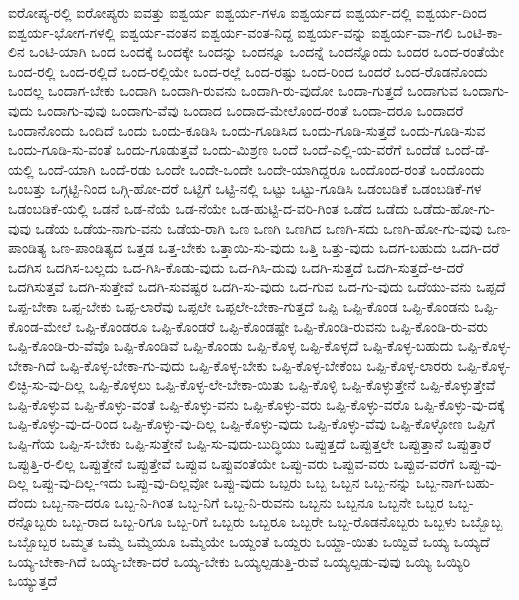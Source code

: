 {ಐರೋಪ್ಯ-ರಲ್ಲಿ
ಐರೋಪ್ಯರು
ಐವತ್ತು
ಐಶ್ವರ್ಯ
ಐಶ್ವರ್ಯ-ಗಳೂ
ಐಶ್ವರ್ಯದ
ಐಶ್ವರ್ಯ-ದಲ್ಲಿ
ಐಶ್ವರ್ಯ-ದಿಂದ
ಐಶ್ವರ್ಯ-ಭೋಗ-ಗಳಲ್ಲಿ
ಐಶ್ವರ್ಯ-ವಂತನ
ಐಶ್ವರ್ಯ-ವಂತ-ನಿದ್ದ
ಐಶ್ವರ್ಯ-ವನ್ನು
ಐಶ್ವರ್ಯ-ವಾ-ಗಲಿ
ಒಂಟಿ-ಕಾ-ಲಿನ
ಒಂಟಿ-ಯಾಗಿ
ಒಂದ
ಒಂದಕ್ಕೆ
ಒಂದಕ್ಕೇ
ಒಂದನ್ನು
ಒಂದನ್ನೂ
ಒಂದನ್ನೆ
ಒಂದನ್ನೊಂದು
ಒಂದರ
ಒಂದ-ರಂತೆಯೇ
ಒಂದ-ರಲ್ಲಿ
ಒಂದ-ರಲ್ಲಿದೆ
ಒಂದ-ರಲ್ಲಿಯೇ
ಒಂದ-ರಲ್ಲೆ
ಒಂದ-ರಷ್ಟು
ಒಂದ-ರಿಂದ
ಒಂದರೆ
ಒಂದ-ರೊಡನೊಂದು
ಒಂದಲ್ಲ
ಒಂದಾಗ-ಬೇಕು
ಒಂದಾಗಿ
ಒಂದಾಗಿ-ರುವನು
ಒಂದಾಗಿ-ರು-ವುದೋ
ಒಂದಾ-ಗುತ್ತದೆ
ಒಂದಾಗುವ
ಒಂದಾಗು-ವುದು
ಒಂದಾಗು-ವುವು
ಒಂದಾಗು-ವೆವು
ಒಂದಾದ
ಒಂದಾದ-ಮೇಲೊಂದ-ರಂತೆ
ಒಂದಾ-ದರೂ
ಒಂದಾದರೆ
ಒಂದಾನೊಂದು
ಒಂದಿದೆ
ಒಂದು
ಒಂದು-ಕೂಡಿಸಿ
ಒಂದು-ಗೂಡಿಸಿದ
ಒಂದು-ಗೂಡಿ-ಸುತ್ತದೆ
ಒಂದು-ಗೂಡಿ-ಸುವ
ಒಂದು-ಗೂಡಿ-ಸು-ವಂತೆ
ಒಂದು-ಗೂಡುತ್ತವೆ
ಒಂದು-ಮಿಶ್ರಣ
ಒಂದೆ
ಒಂದೆ-ಎಲ್ಲಿ-ಯ-ವರೆಗೆ
ಒಂದೆಡೆ
ಒಂದೆ-ಡೆ-ಯಲ್ಲಿ
ಒಂದೆ-ಯಾಗಿ
ಒಂದೆ-ರಡು
ಒಂದೇ
ಒಂದೇ-ಒಂದೇ
ಒಂದೇ-ಯಾಗಿದ್ದರೂ
ಒಂದೊಂದ-ರಂತೆ
ಒಂದೊಂದು
ಒಂಬತ್ತು
ಒಗ್ಗಟ್ಟಿ-ನಿಂದ
ಒಗ್ಗಿ-ಹೋ-ದರೆ
ಒಟ್ಟಿಗೆ
ಒಟ್ಟಿ-ನಲ್ಲಿ
ಒಟ್ಟು
ಒಟ್ಟು-ಗೂಡಿಸಿ
ಒಡಂಬಡಿಕೆ
ಒಡಂಬಡಿಕೆ-ಗಳ
ಒಡಂಬಡಿಕೆ-ಯಲ್ಲಿ
ಒಡನೆ
ಒಡ-ನೆಯೆ
ಒಡ-ನೆಯೇ
ಒಡ-ಹುಟ್ಟಿ-ದ-ವರಿ-ಗಿಂತ
ಒಡೆದ
ಒಡೆದು
ಒಡೆದು-ಹೋ-ಗು-ವುವು
ಒಡೆಯ
ಒಡೆಯ-ನಾಗು-ವನು
ಒಡೆಯ-ರಾಗಿ
ಒಣ
ಒಣಗಿ
ಒಣಗಿದ
ಒಣಗಿ-ಸದು
ಒಣಗಿ-ಹೋ-ಗು-ವುವು
ಒಣ-ಪಾಂಡಿತ್ಯ
ಒಣ-ಪಾಂಡಿತ್ಯದ
ಒತ್ತಡ
ಒತ್ತ-ಬೇಕು
ಒತ್ತಾಯಿ-ಸು-ವುದು
ಒತ್ತಿ
ಒತ್ತು-ವುದು
ಒದಗ-ಬಹುದು
ಒದಗಿ-ದರೆ
ಒದಗಿಸ
ಒದಗಿಸ-ಬಲ್ಲದು
ಒದ-ಗಿಸಿ-ಕೊಡು-ವುದು
ಒದ-ಗಿಸಿ-ದುವು
ಒದಗಿ-ಸುತ್ತದೆ
ಒದಗಿ-ಸುತ್ತದೆ-ಆ-ದರೆ
ಒದಗಿಸುತ್ತವೆ
ಒದಗಿ-ಸುತ್ತೇವೆ
ಒದಗಿ-ಸುವಷ್ಟರ
ಒದಗಿ-ಸು-ವುದು
ಒದ-ಗುವ
ಒದ-ಗು-ವುದು
ಒದೆಯು-ವನು
ಒಪ್ಪದೆ
ಒಪ್ಪ-ಬೇಕಾ
ಒಪ್ಪ-ಬೇಕು
ಒಪ್ಪ-ಲಾರೆವು
ಒಪ್ಪಲೇ
ಒಪ್ಪಲೇ-ಬೇಕಾ-ಗುತ್ತದೆ
ಒಪ್ಪಿ
ಒಪ್ಪಿ-ಕೊಂಡ
ಒಪ್ಪಿ-ಕೊಂಡನು
ಒಪ್ಪಿ-ಕೊಂಡ-ಮೇಲೆ
ಒಪ್ಪಿ-ಕೊಂಡರೂ
ಒಪ್ಪಿ-ಕೊಂಡರೆ
ಒಪ್ಪಿ-ಕೊಂಡಷ್ಟೇ
ಒಪ್ಪಿ-ಕೊಂಡಿ-ರುವನು
ಒಪ್ಪಿ-ಕೊಂಡಿ-ರು-ವರು
ಒಪ್ಪಿ-ಕೊಂಡಿ-ರು-ವೆವೊ
ಒಪ್ಪಿ-ಕೊಂಡಿವೆ
ಒಪ್ಪಿ-ಕೊಂಡು
ಒಪ್ಪಿ-ಕೊಳ್ಳ
ಒಪ್ಪಿ-ಕೊಳ್ಳದೆ
ಒಪ್ಪಿ-ಕೊಳ್ಳ-ಬಹುದು
ಒಪ್ಪಿ-ಕೊಳ್ಳ-ಬೇಕಾ-ಗಿದೆ
ಒಪ್ಪಿ-ಕೊಳ್ಳ-ಬೇಕಾ-ಗು-ವುದು
ಒಪ್ಪಿ-ಕೊಳ್ಳ-ಬೇಕು
ಒಪ್ಪಿ-ಕೊಳ್ಳ-ಬೇಕೆಂಬ
ಒಪ್ಪಿ-ಕೊಳ್ಳ-ಲಾರರು
ಒಪ್ಪಿ-ಕೊಳ್ಳ-ಲಿಚ್ಛಿ-ಸು-ವು-ದಿಲ್ಲ
ಒಪ್ಪಿ-ಕೊಳ್ಳಲು
ಒಪ್ಪಿ-ಕೊಳ್ಳ-ಲೇ-ಬೇಕಾ-ಯಿತು
ಒಪ್ಪಿ-ಕೊಳ್ಳಿ
ಒಪ್ಪಿ-ಕೊಳ್ಳುತ್ತೇನೆ
ಒಪ್ಪಿ-ಕೊಳ್ಳುತ್ತೇವೆ
ಒಪ್ಪಿ-ಕೊಳ್ಳುವ
ಒಪ್ಪಿ-ಕೊಳ್ಳು-ವಂತೆ
ಒಪ್ಪಿ-ಕೊಳ್ಳು-ವನು
ಒಪ್ಪಿ-ಕೊಳ್ಳು-ವರು
ಒಪ್ಪಿ-ಕೊಳ್ಳು-ವರೊ
ಒಪ್ಪಿ-ಕೊಳ್ಳು-ವು-ದಕ್ಕೆ
ಒಪ್ಪಿ-ಕೊಳ್ಳು-ವು-ದ-ರಿಂದ
ಒಪ್ಪಿ-ಕೊಳ್ಳು-ವು-ದಿಲ್ಲ
ಒಪ್ಪಿ-ಕೊಳ್ಳು-ವುದು
ಒಪ್ಪಿ-ಕೊಳ್ಳು-ವೆವು
ಒಪ್ಪಿ-ಕೊಳ್ಳೋಣ
ಒಪ್ಪಿಗೆ
ಒಪ್ಪಿ-ಗೆಯ
ಒಪ್ಪಿ-ಸ-ಬೇಕು
ಒಪ್ಪಿ-ಸುತ್ತೇನೆ
ಒಪ್ಪಿ-ಸು-ವುದು-ಬುದ್ಧಿಯು
ಒಪ್ಪುತ್ತದೆ
ಒಪ್ಪುತ್ತಲೇ
ಒಪ್ಪುತ್ತಾನೆ
ಒಪ್ಪುತ್ತಾರೆ
ಒಪ್ಪುತ್ತಿ-ರ-ಲಿಲ್ಲ
ಒಪ್ಪುತ್ತೇನೆ
ಒಪ್ಪುತ್ತೇವೆ
ಒಪ್ಪುವ
ಒಪ್ಪುವಂತೆಯೇ
ಒಪ್ಪು-ವರು
ಒಪ್ಪುವ-ವರು
ಒಪ್ಪುವ-ವರೆಗೆ
ಒಪ್ಪು-ವು-ದಿಲ್ಲ
ಒಪ್ಪು-ವು-ದಿಲ್ಲ-ಇದು
ಒಪ್ಪು-ವು-ದಿಲ್ಲವೋ
ಒಪ್ಪು-ವುದು
ಒಬ್ಪರು
ಒಬ್ಬ
ಒಬ್ಬನ
ಒಬ್ಬ-ನನ್ನು
ಒಬ್ಬ-ನಾಗ-ಬಹು-ದೆಂದು
ಒಬ್ಬ-ನಾ-ದರೂ
ಒಬ್ಬ-ನಿ-ಗಿಂತ
ಒಬ್ಬ-ನಿಗೆ
ಒಬ್ಬ-ನಿ-ರುವನು
ಒಬ್ಬನು
ಒಬ್ಬನೂ
ಒಬ್ಬನೇ
ಒಬ್ಬರ
ಒಬ್ಬ-ರನ್ನೊಬ್ಬರು
ಒಬ್ಬ-ರಾದ
ಒಬ್ಬ-ರಿಗೂ
ಒಬ್ಬ-ರಿಗೆ
ಒಬ್ಬರು
ಒಬ್ಬರೂ
ಒಬ್ಬರೇ
ಒಬ್ಬ-ರೊಡನೊಬ್ಬರು
ಒಬ್ಬಳು
ಒಬ್ಬೊಬ್ಬ
ಒಬ್ಬೊಬ್ಬರ
ಒಮ್ಮತ
ಒಮ್ಮೆ
ಒಮ್ಮೆಯೂ
ಒಮ್ಮೆಯೇ
ಒಯ್ದಂತೆ
ಒಯ್ದರು
ಒಯ್ದಾ-ಯಿತು
ಒಯ್ದಿವೆ
ಒಯ್ಯ
ಒಯ್ಯದೆ
ಒಯ್ಯ-ಬೇಕಾ-ಗಿದೆ
ಒಯ್ಯ-ಬೇಕಾ-ದರೆ
ಒಯ್ಯ-ಬೇಕು
ಒಯ್ಯಲ್ಪಡುತ್ತಿ-ರುವೆ
ಒಯ್ಯಲ್ಪಡು-ವುವು
ಒಯ್ಯಿ
ಒಯ್ಯಿರಿ
ಒಯ್ಯುತ್ತದೆ
}
